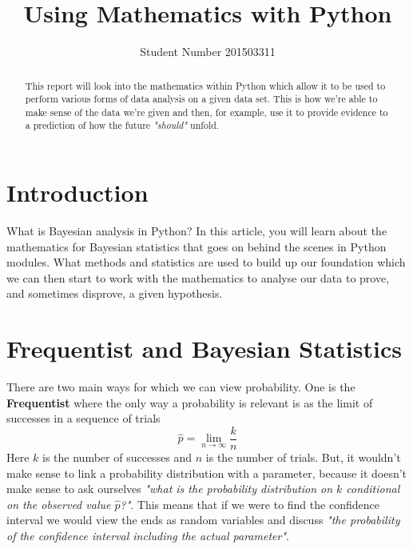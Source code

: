 \documentclass[11pt]{article}   %
\begin{document}
\title{Using Mathematics with Python}
\author{Student Number 201503311}  %
\date{}   %

\maketitle

\begin{abstract}

This report will look into the mathematics within Python which allow it to be used to perform various forms of data analysis on a given data set. This is how we're able to make sense of the data we're given and then, for example, use it to provide evidence to a prediction of how the future \textit{"should"} unfold.

\end{abstract}

\section{Introduction}

What is Bayesian analysis in Python? In this article, you will learn about the mathematics for Bayesian statistics that goes on behind the scenes in Python modules. What methods and statistics are used to build up our foundation which we can then start to work with the mathematics to analyse our data to prove, and sometimes disprove, a given hypothesis.

\section{Frequentist and Bayesian Statistics}\label{Frequentist and Bayesian Statistics}

There are two main ways for which we can view probability. One is the \textbf{Frequentist} where the only way a probability is relevant is as the limit of successes in a sequence of trials
$$\hat{p} = \lim_{n\to\infty} \frac{k}{n}$$
Here $k$ is the number of successes and $n$ is the number of trials. But, it wouldn't make sense to link a probability distribution with a parameter, because it doesn't make sense to ask ourselves \textit{"what is the probability distribution on $k$ conditional on the observed value $\hat{p}$?"}. This means that if we were to find the confidence interval we would view the ends as random variables and discuss \textit{"the probability of the confidence interval including the actual parameter"}.
\end{document}
